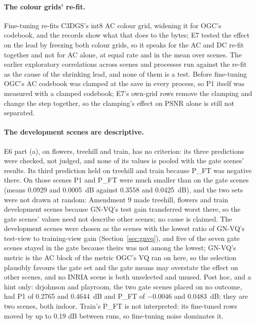 \paragraph{The colour grids' re-fit.}
Fine-tuning re-fits C3DGS's int8 AC colour grid, widening it for OGC's codebook, and the records show what that does to the bytes; E7 tested the effect on the lead by freezing both colour grids, so it speaks for the AC and DC re-fit together and not for AC alone, at equal rate and in the mean over scenes. %
The earlier exploratory correlations across scenes and processes run against the re-fit as the cause of the shrinking lead, and none of them is a test. %
Before fine-tuning OGC's AC codebook was clamped at the save in every process, so P1 itself was measured with a clamped codebook; E7's own-grid rows remove the clamping and change the step together, so the clamping's effect on PSNR alone is still not separated. %

\paragraph{The development scenes are descriptive.}
E6 part (a), on flowers, treehill and train, has no criterion: its three predictions were checked, not judged, and none of its values is pooled with the gate scenes' results. %
Its third prediction held on treehill and train because P\_FT was negative there. %
On those scenes P1 and P\_FT were much smaller than on the gate scenes (means 0.0929 and 0.0005~dB against 0.3558 and 0.0425~dB), and the two sets were not drawn at random: Amendment 9 made treehill, flowers and train development scenes because GN-VQ's test gain transferred worst there, so the gate scenes' values need not describe other scenes; no cause is claimed. %
The development scenes were chosen as the scenes with the lowest ratio of GN-VQ's test-view to training-view gain (Section~\ref{sec:gnvq}), and five of the seven gate scenes stayed in the gate because theirs was not among the lowest; GN-VQ's metric is the AC block of the metric OGC's VQ ran on here, so the selection plausibly favours the gate set and the gate means may overstate the effect on other scenes, and no INRIA scene is both unselected and unused. %
Post hoc, and a hint only: drjohnson and playroom, the two gate scenes placed on no outcome, had P1 of 0.2765 and 0.4644~dB and P\_FT of $-0.0046$ and 0.0483~dB; they are two scenes, both indoor. %
Train's P\_FT is not interpreted: its fine-tuned rows moved by up to 0.19 dB between runs, so fine-tuning noise dominates it. %

